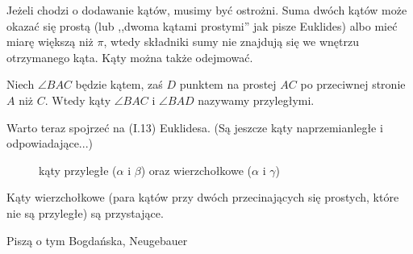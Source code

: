 Jeżeli chodzi o dodawanie kątów, musimy być ostrożni.
Suma dwóch kątów może okazać się prostą (lub ,,dwoma kątami prostymi'' jak pisze Euklides) albo mieć miarę większą niż $\pi$, wtedy składniki sumy nie znajdują się we wnętrzu otrzymanego kąta.
Kąty można także odejmować.

\begin{definition}
    Niech $\angle BAC$ będzie kątem, zaś $D$ punktem na prostej $AC$ po przeciwnej stronie $A$ niż $C$.
    Wtedy kąty $\angle BAC$ i $\angle BAD$ nazywamy przyległymi. %
\end{definition}

Warto teraz spojrzeć na (I.13) Euklidesa.
(Są jeszcze kąty naprzemianległe i odpowiadające...)

\begin{figure}[H] \centering
\begin{comment}
\begin{tikzpicture}[scale=.6]
    \tkzDefPoint(-4, -2){A}
    \tkzDefPoint(4, 2){B}
    \tkzDefPoint(4, -2){C}
    \tkzDefPoint(-4, 2){D}
    \tkzDefPoint(0, 0){Zero}
    \tkzDefPoint(0, 0.7){X1}
    \tkzDefPoint(-1.7, 0){X2}
    \tkzDefPoint(1.7, 0){X3}
    \tkzMarkAngle[arc=l,size=1.2,mark=||](D,Zero,A)
    \tkzMarkAngle[arc=l,size=1.2,mark=||](C,Zero,B)
    \tkzMarkAngle[arc=ll,size=1.2](B,Zero,D)

    \tkzDrawSegments[line width=0.3mm](A,B)
    \tkzDrawSegments[line width=0.3mm](C,D)
    \tkzLabelPoint[anchor=center](X1){$\beta$}
    \tkzLabelPoint[anchor=center](X2){$\alpha$}
    \tkzLabelPoint[anchor=center](X3){$\gamma$}
\end{tikzpicture}
\end{comment}
    \caption{kąty przyległe ($\alpha$ i $\beta$) oraz wierzchołkowe ($\alpha$ i $\gamma$)}
\end{figure}

\begin{proposition}
%
    Kąty wierzchołkowe (para kątów przy dwóch przecinających się prostych, które nie są przyległe) są przystające.
\end{proposition}

Piszą o tym Bogdańska, Neugebauer \cite[s. 6]{neugebauer_2018}


